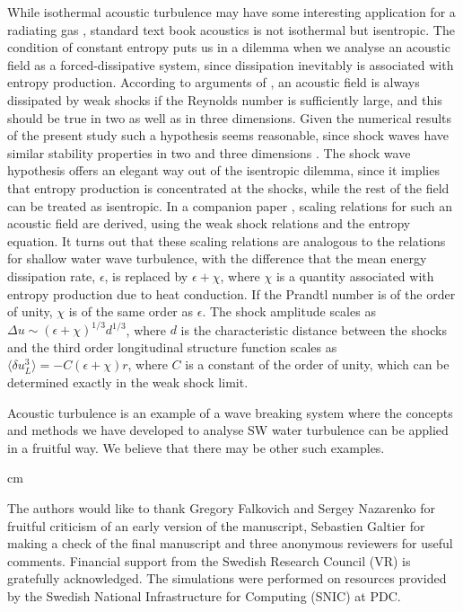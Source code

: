 While isothermal acoustic turbulence may have some interesting application for a radiating gas \cite[]{Stein1967}, standard text book acoustics is not isothermal but isentropic. The  condition of constant entropy puts us in a dilemma when we analyse an acoustic field as a forced-dissipative system, since dissipation inevitably is associated with entropy production.  According to arguments of \cite{KadomtsevPet1973}, an acoustic field is always dissipated by weak shocks if the Reynolds number is sufficiently large,  and this should be true in two as well as in three dimensions.  Given the numerical results of the present study such a hypothesis seems reasonable, since shock waves have similar stability properties 
in two and three dimensions \cite[]{ApazidisEliasson2018, LivertsApazidis2016}.  The shock wave hypothesis offers an elegant way out of the isentropic dilemma, since it implies that entropy production is concentrated at the shocks, while the rest of the field can be treated as isentropic. In a companion paper \cite[]{Lindborg2019}, scaling relations for such an acoustic field are derived, using the weak shock relations and the entropy equation. It turns out that these scaling relations are analogous to the relations for shallow water wave turbulence, with the  difference 
that the mean energy dissipation rate, $ \epsilon $, is replaced by $ \epsilon + \chi $, where $ \chi $ is a quantity associated with entropy production due to heat conduction. If  the Prandtl number is of the order of unity, $ \chi $ is of the same order as $ \epsilon $.  The shock amplitude scales as $ \Delta u \sim (\epsilon + \chi)^{1/3} d^{1/3} $, where $ d $ is the characteristic distance between the shocks and the third order longitudinal structure function scales as $ \langle \delta u_L^{3} \rangle = -C (\epsilon + \chi)r $, where $ C $ is a constant of the order of unity, which can be determined exactly in the weak shock limit. 

Acoustic turbulence is an example of a wave breaking system where the concepts and methods we have developed to analyse SW water turbulence can be applied in a fruitful way.  We believe that there may be other such examples.


 cm

\noindent The authors would like to thank Gregory Falkovich and Sergey Nazarenko for  fruitful criticism of an early version of the manuscript, Sebastien Galtier for making a check of the final manuscript and three anonymous reviewers for useful comments. Financial
support from the Swedish Research Council (VR) is gratefully
acknowledged. The simulations were performed
on resources provided by the Swedish National Infrastructure
for Computing (SNIC) at PDC.



